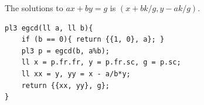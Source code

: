 The solutions to $ax + by = g$ is $(x + bk/g, y - ak/g)$.
\begin{verbatim}
pl3 egcd(ll a, ll b){
	if (b == 0){ return {{1, 0}, a}; }
	pl3 p = egcd(b, a%b);
	ll x = p.fr.fr, y = p.fr.sc, g = p.sc;
	ll xx = y, yy = x - a/b*y;
	return {{xx, yy}, g};
}
\end{verbatim}